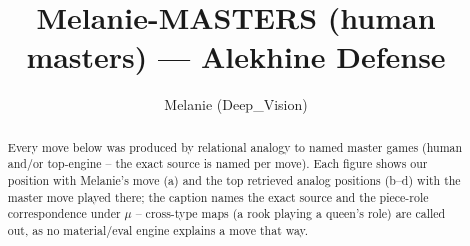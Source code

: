 \documentclass[11pt]{article}
\title{Melanie-MASTERS (human masters) — Alekhine Defense}
\author{Melanie (Deep\_Vision)}
\date{}
\begin{document}
\maketitle

\begin{abstract}Every move below was produced by relational analogy to named master games (human and/or top-engine -- the exact source is named per move). Each figure shows our position with Melanie's move (a) and the top retrieved analog positions (b--d) with the master move played there; the caption names the exact source and the piece-role correspondence under $\mu$ -- cross-type maps (a rook playing a queen's role) are called out, as no material/eval engine explains a move that way.\end{abstract}

\begin{figure}[p]\centering
\begin{subfigure}{0.46\textwidth}\centering
\resizebox{\linewidth}{!}{%
\newchessgame
\chessboard[
  setfen={rnbqk2r/ppp1ppbp/1n1p2p1/4P3/3P4/1B3N2/PPP2PPP/RNBQK2R w KQkq - 4 7},
  showmover=false,
  pgfstyle=straightmove, color=movearrow, markmove={e1-g1}
]}
\caption{}
\end{subfigure}\hfill
\begin{subfigure}{0.46\textwidth}\centering
\resizebox{\linewidth}{!}{%
\newchessgame
\chessboard[
  setfen={rnbq1rk1/1p2ppbp/1n1p2p1/p3P3/P2P1B2/1B3N2/1P3PPP/RN1QK2R w KQ - 0 11},
  showmover=false,
  pgfstyle=straightmove, color=movearrow, markmove={e1-g1}
]}
\caption{}
\end{subfigure}
\\[4pt]
\begin{subfigure}{0.46\textwidth}\centering
\resizebox{\linewidth}{!}{%
\newchessgame
\chessboard[
  setfen={rnbqr1k1/1p3pbp/p2p1np1/2pP4/P3P3/2NB1N1P/1P3PP1/R1BQK2R w KQ - 1 11},
  showmover=false,
  pgfstyle=straightmove, color=movearrow, markmove={e1-g1}
]}
\caption{}
\end{subfigure}\hfill
\begin{subfigure}{0.46\textwidth}\centering
\resizebox{\linewidth}{!}{%
\newchessgame
\chessboard[
  setfen={rnbqr1k1/1p3pbp/p2p1np1/2pP4/P3P3/2NB1N1P/1P3PP1/R1BQK2R w KQ - 1 11},
  showmover=false,
  pgfstyle=straightmove, color=movearrow, markmove={e1-g1}
]}
\caption{}
\end{subfigure}

\end{figure}
\end{document}
